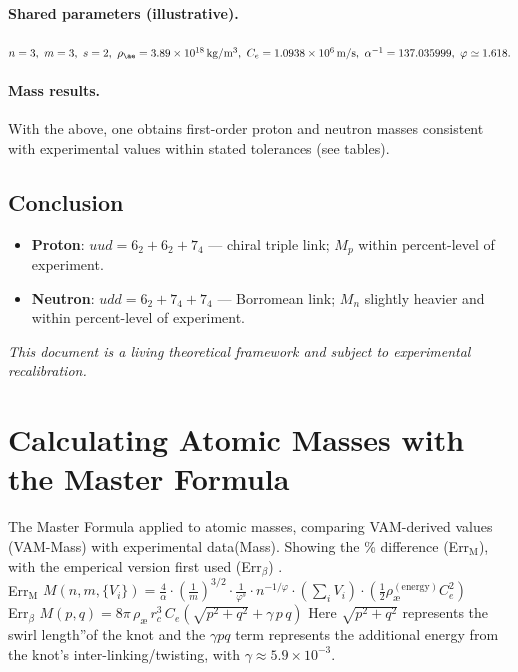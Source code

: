 \documentclass[12pt]{article}
\begin{document}
  \paragraph{Shared parameters (illustrative).}
  \(n=3,\ m=3,\ s=2,\ \rho_{\ae}=3.89\times10^{18}\,\mathrm{kg/m^3},\
  C_e=1.0938\times10^{6}\,\mathrm{m/s},\
  \alpha^{-1}=137.035999,\ \varphi\simeq1.618.\)

  \paragraph{Mass results.}
  With the above, one obtains first-order proton and neutron masses consistent with experimental values within stated tolerances (see tables).

  \subsection{Conclusion}
  \begin{itemize}
      \item \textbf{Proton}: \(uud=6_2+6_2+7_4\) — chiral triple link; \(M_p\) within percent-level of experiment.
      \item \textbf{Neutron}: \(udd=6_2+7_4+7_4\) — Borromean link; \(M_n\) slightly heavier and within percent-level of experiment.
  \end{itemize}

\textit{This document is a living theoretical framework and subject to experimental recalibration.}

  
  

\appendix
      \section{Calculating Atomic Masses with the Master Formula}\label{sec:AtomicMasses}
  The Master Formula applied to atomic masses, comparing VAM-derived values (VAM-Mass) with experimental data(Mass). Showing the \% difference (Err$_\text{M}$), with the emperical version first used (Err$_\beta$)  .   \\ Err$_\text{M}$ \( M(n, m, \{V_i\}) = \frac{4}{\alpha} \cdot \left( \frac{1}{m} \right)^{3/2} \cdot \frac{1}{\varphi^s} \cdot n^{-1/\varphi} \cdot \left( \sum_i V_i \right) \cdot \left( \frac{1}{2} \rho_\text{\ae}^{(\text{energy})} C_e^2 \right) \)\\
  Err$_\beta$ \(  M(p,q) = 8\pi\,\rho_{\text{\ae}}\,r_c^3\,C_e \left(\sqrt{p^2 + q^2} + \gamma\, p\,q\right) \)
  Here $\sqrt{p^2+q^2}$ represents the \grqq swirl length\textquotedblright of the knot and the $\gamma p q$ term represents the additional energy from the knot's inter-linking/twisting, with $\gamma \approx 5.9\times10^{-3}$.
\end{document}
